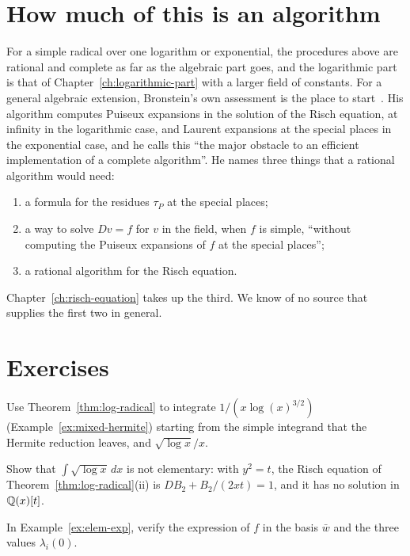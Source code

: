 \section{How much of this is an algorithm}\label{sec:elem-status}

For a simple radical over one logarithm or exponential, the procedures above
are rational and complete as far as the algebraic part goes, and the
logarithmic part is that of Chapter~\ref{ch:logarithmic-part} with a larger
field of constants. For a general algebraic extension, Bronstein's own
assessment is the place to
start~\cite[Conclusions]{bronstein1990}. His algorithm computes Puiseux
expansions in the solution of the Risch equation, at infinity in the
logarithmic case, and Laurent expansions at the special places in the
exponential case, and he calls this ``the major obstacle to an efficient
implementation of a complete algorithm''. He names three things that a
rational algorithm would need:
\begin{enumerate}[label=\textup{(\roman*)}]
\item a formula for the residues $\tau_P$ at the special places;
\item a way to solve $Dv = f$ for $v$ in the field, when $f$ is simple,
  ``without computing the Puiseux expansions of $f$ at the special places'';
\item a rational algorithm for the Risch equation.
\end{enumerate}
Chapter~\ref{ch:risch-equation} takes up the third. We know of no source
that supplies the first two in general.

\section*{Exercises}

\begin{exercise}
Use Theorem~\ref{thm:log-radical} to integrate $1/(x \log(x)^{3/2})$
(Example~\ref{ex:mixed-hermite}) starting from the simple integrand that
the Hermite reduction leaves, and $\sqrt{\log x}/x$.
\end{exercise}

\begin{exercise}
Show that $\int \sqrt{\log x}\,dx$ is not elementary: with $y^2 = t$, the
Risch equation of Theorem~\ref{thm:log-radical}(ii) is $DB_2 + B_2/(2xt) =
1$, and it has no solution in $\mathbb{Q}(x)[t]$.
\end{exercise}

\begin{exercise}
In Example~\ref{ex:elem-exp}, verify the expression of $f$ in the basis
$\bar w$ and the three values $\lambda_i(0)$.
\end{exercise}
